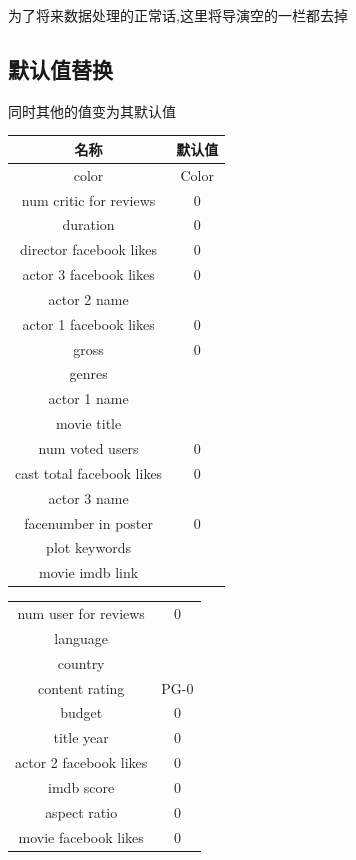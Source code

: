 \documentclass[a4paper]{article}
\begin{document}
为了将来数据处理的正常话,这里将导演空的一栏都去掉
\subsection{默认值替换} \label{sub:default-data}
同时其他的值变为其默认值

\begin{table}[h]
    \centering
    \begin{tabular}{ |c|c| }
名称 & 默认值 \\\hline
color & Color \\ 
num critic for reviews & 0 \\ 
duration & 0 \\ 
director facebook likes & 0 \\ 
actor 3 facebook likes & 0 \\ 
actor 2 name & \ \\ 
actor 1 facebook likes & 0 \\ 
gross & 0 \\ 
genres & \ \\ 
actor 1 name & \ \\ 
movie title &   \\ 
num voted users & 0 \\ 
cast total facebook likes & 0 \\ 
actor 3 name &  \\
facenumber in poster & 0 \\ 
plot keywords &  \\ 
movie imdb link &  \\ 
    \end{tabular}
\end{table}

\newpage

\begin{table}[h]
    \centering
    \begin{tabular}{ |c|c| }
num user for reviews & 0 \\ 
language &  \\ 
country &  \\ 
content rating & PG-0 \\ 
budget & 0 \\ 
title year & 0 \\ 
actor 2 facebook likes & 0 \\ 
imdb score & 0 \\ 
aspect ratio & 0 \\ 
movie facebook likes & 0 \\ 
\end{tabular}
\end{table}
\end{document}
